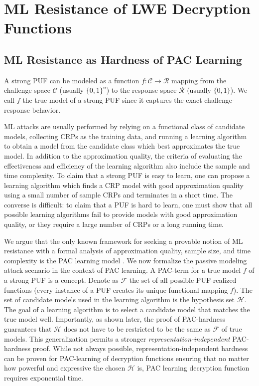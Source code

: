 \section{ML Resistance of LWE Decryption Functions}
\label{sec:lwe}

\subsection{ML Resistance as Hardness of PAC Learning}
A strong PUF can be modeled as a function $f:\mathcal{C}\rightarrow \mathcal{R}$ mapping from the challenge space $\mathcal{C}$ (usually $\{0,1\}^n$) to the response space $\mathcal{R}$ (usually $\{0,1\}$).
We call $f$ the true model of a strong PUF since it captures the exact challenge-response behavior. 

ML attacks are usually performed by relying on a functional class of candidate models, collecting CRPs as the training data, and running a learning algorithm to obtain a model from the candidate class which best approximates the true model. In addition to the approximation quality, the criteria of evaluating the effectiveness and efficiency of the learning algorithm also include the sample and time complexity. 
To claim that a strong PUF is easy to learn, one can propose a learning algorithm which finds a CRP model with good approximation quality using a small number of sample CRPs and terminates in a short time.
The converse is difficult: 
to claim that a PUF is hard to learn, one must show that all possible learning algorithms fail to provide models with good approximation quality, or they require a large number of CRPs or a long running time.

We argue that the only known framework for seeking a provable notion of ML resistance with a formal analysis of approximation quality, sample size, and time complexity is the PAC learning model \cite{mohri2012foundations}.
We now formalize the passive modeling attack scenario in the context of PAC learning.
A PAC-term for a true model $f$ of a strong PUF is a concept.
Denote as $\mathcal{F}$ the set of all possible PUF-realized functions (every instance of a PUF creates its unique functional mapping $f$).
The set of candidate models used in the learning algorithm is the hypothesis set $\mathcal{H}$. The goal of a learning algorithm is to select a candidate model that matches the true model well. 
Importantly, as shown later, the proof of PAC-hardness guarantees that $\mathcal{H}$ does not have to be restricted to be the same as $\mathcal{F}$ of true models.
This generalization permits a stronger \emph{representation-independent} PAC-hardness proof. While not always possible, representation-independent hardness can be proven for PAC-learning of decryption functions ensuring that no matter how powerful and expressive the chosen $\mathcal{H}$ is, PAC learning decryption function requires exponential time. 

